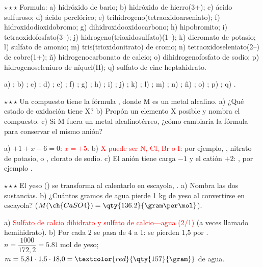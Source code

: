 \begin{exercise}
    \(\star\star\star\) Formula: a) hidróxido de bario; b) hidróxido de hierro(3+); c) ácido sulfuroso; d) ácido perclórico; e)
    trihidrogeno(tetraoxidoarseniato); f) hidroxidodioxidobromo; g) dihidroxidooxidocarbono; h) hipobromito; i)
    tetraoxidofosfato(3\nobreakdash--); j) hidrogeno(trioxidosulfato)(1\nobreakdash--); k) dicromato de potasio; l) sulfato de amonio; m)
    tris(trioxidonitrato) de cromo; n) tetraoxidoseleniato(2\nobreakdash--) de cobre(1+); ñ) hidrogenocarbonato de calcio; o)
    dihidrogenofosfato de sodio; p) hidrogenoseleniuro de níquel(II); q) sulfato de cinc heptahidrato.
    \begin{solu}
        a) \textcolor{red}{}; b) \textcolor{red}{}; c) \textcolor{red}{}; d)
        \textcolor{red}{}; e) \textcolor{red}{}; f) \textcolor{red}{}; g) \textcolor{red}{};
        h) \textcolor{red}{}; i) \textcolor{red}{}; j) \textcolor{red}{}; k)
        \textcolor{red}{}; l) \textcolor{red}{}; m) \textcolor{red}{}; n)
        \textcolor{red}{}; ñ) \textcolor{red}{}; o) \textcolor{red}{}; p)
        \textcolor{red}{}; q) \textcolor{red}{}.
    \end{solu}
\end{exercise}

\begin{exercise}
    \(\star\star\star\) Un compuesto tiene la fórmula , donde M es un metal alcalino. a) ¿Qué estado de oxidación tiene
    X? b) Propón un elemento X posible y nombra el compuesto. c) Si M fuera un metal alcalinotérreo, ¿cómo cambiaría la fórmula
    para conservar el mismo anión?
    \begin{solu}
        a) \(+1 + x - 6 = 0\): \textcolor{red}{\(x = +5\)}. b) \textcolor{red}{X puede ser N, Cl, Br o I}: por ejemplo,
        , nitrato de potasio, o , clorato de sodio. c) El anión  tiene carga \(-1\) y el catión
        \(+2\): \textcolor{red}{}, por ejemplo .
    \end{solu}
\end{exercise}

\begin{exercise}
    \(\star\star\star\) El yeso () se transforma al calentarlo en escayola, . a) Nombra
    las dos sustancias. b) ¿Cuántos gramos de agua pierde 1 kg de yeso al convertirse en escayola? (\(M(\ch{CaSO4}) =
    \qty{136.2}{\gram\per\mol}\)).
    \begin{solu}
        a) \textcolor{red}{Sulfato de calcio dihidrato y sulfato de calcio---agua (2/1)} (a veces llamado hemihidrato).
        b) Por cada 2  se pasa de 4  a 1: se pierden 1,5  por .
        \(n = \dfrac{1000}{172{,}2} = \qty{5.81}{\mol}\) de yeso; \(m = 5{,}81 \cdot 1{,}5 \cdot 18{,}0 =
        \textcolor{red}{\qty{157}{\gram}}\) de agua.
    \end{solu}
\end{exercise}

